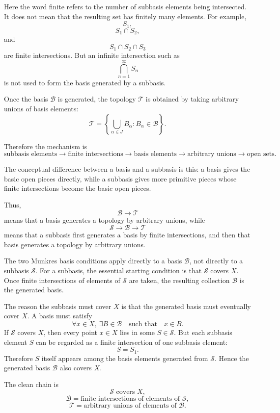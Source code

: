\documentclass{article}
\begin{document}
	Here the word finite refers to the number of subbasis elements being intersected. It does not mean that the resulting set has finitely many elements. For example,
	$$
	S_1,
	$$
	$$
	S_1\cap S_2,
	$$
	and
	$$
	S_1\cap S_2\cap S_3
	$$
	are finite intersections. But an infinite intersection such as
	$$
	\bigcap_{n=1}^{\infty}S_n
	$$
	is not used to form the basis generated by a subbasis.
	
	Once the basis \(\mathcal B\) is generated, the topology \(\mathcal T\) is obtained by taking arbitrary unions of basis elements:
	$$
	\mathcal T
	=
	\left\{
	\bigcup_{\alpha\in J}B_\alpha:
	B_\alpha\in\mathcal B
	\right\}.
	$$
	
	Therefore the mechanism is
	$$
	\text{subbasis elements}
	\longrightarrow
	\text{finite intersections}
	\longrightarrow
	\text{basis elements}
	\longrightarrow
	\text{arbitrary unions}
	\longrightarrow
	\text{open sets}.
	$$
	
	The conceptual difference between a basis and a subbasis is this: a basis gives the basic open pieces directly, while a subbasis gives more primitive pieces whose finite intersections become the basic open pieces.
	
	Thus,
	$$
	\mathcal B\longrightarrow\mathcal T
	$$
	means that a basis generates a topology by arbitrary unions, while
	$$
	\mathcal S\longrightarrow\mathcal B\longrightarrow\mathcal T
	$$
	means that a subbasis first generates a basis by finite intersections, and then that basis generates a topology by arbitrary unions.
	
	The two Munkres basis conditions apply directly to a basis \(\mathcal B\), not directly to a subbasis \(\mathcal S\). For a subbasis, the essential starting condition is that \(\mathcal S\) covers \(X\). Once finite intersections of elements of \(\mathcal S\) are taken, the resulting collection \(\mathcal B\) is the generated basis.
	
	The reason the subbasis must cover \(X\) is that the generated basis must eventually cover \(X\). A basis must satisfy
	$$
	\forall x\in X,\ \exists B\in\mathcal B
	\quad\text{such that}\quad
	x\in B.
	$$
	If \(\mathcal S\) covers \(X\), then every point \(x\in X\) lies in some \(S\in\mathcal S\). But each subbasis element \(S\) can be regarded as a finite intersection of one subbasis element:
	$$
	S=S_1.
	$$
	Therefore \(S\) itself appears among the basis elements generated from \(\mathcal S\). Hence the generated basis \(\mathcal B\) also covers \(X\).
	
	The clean chain is
	$$
	\mathcal S\text{ covers }X,
	$$
	$$
	\mathcal B=\text{finite intersections of elements of }\mathcal S,
	$$
	$$
	\mathcal T=\text{arbitrary unions of elements of }\mathcal B.
	$$
	
\end{document}
